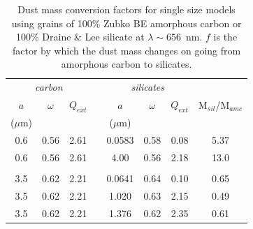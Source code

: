 \begin{table}
	\caption{Dust mass conversion factors for single size models using  
grains of 100\% Zubko BE amorphous carbon or 100\% Draine \& Lee silicate 
at $\lambda \sim 656$~nm. $f$ is the factor by which the dust mass 
changes on going from amorphous carbon to silicates.}
	\label{tb_sil}
	\begin{center}
  	\begin{tabular}{@{} cccccccc @{}}
    	\hline
	\multicolumn{3}{c}{\textit{carbon}} && \multicolumn{3}{c}{\textit{silicates}} & \\
$a$ &$\omega$ &  $Q_{ext}$ & &$a$&$\omega$ & $Q_{ext}$ & M$_{sil}$/M$_{amc}$ \\
($\mu$m) &&&&($\mu$m)\\
\hline
0.6 & 0.56 & 2.61 & &0.0583 & 0.58 &0.08 & 5.37 \\
0.6 &0.56 & 2.61 & &4.00 & 0.56 & 2.18 & 13.0 \\
 \\
3.5 & 0.62 &2.21 & &0.0641 & 0.64 & 0.10 & 0.65 \\
3.5 & 0.62 &2.21 & &1.020 & 0.63 & 2.15 & 0.49 \\
3.5 & 0.62 & 2.21 & &1.376 & 0.62 & 2.35 & 0.61 \\


    \hline
  \end{tabular}
  \end{center}
\end{table}

